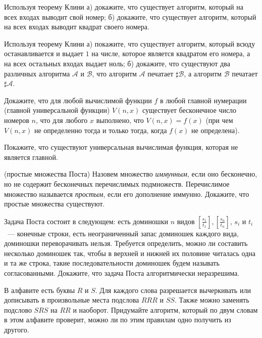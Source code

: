 \setcounter{curtask}{23}


\newcommand{\dom}[2]{\left[\frac{#1}{#2}\right]}


\begin{task}
    Используя теорему Клини а) докажите, что существует алгоритм, который на всех входах выводит свой номер;
    б) докажите, что существует алгоритм, который на всех входах выводит квадрат своего номера.
\end{task}

\begin{task}
    Используя теорему Клини а) покажите, что существует алгоритм, который всюду останавливается и выдает $1$ на числе, которое
    является квадратом его номера, а на всех остальных входах выдает ноль; б) докажите, что существуют два различных алгоритма
    $\mathcal{A}$ и $\mathcal{B}$, что алгоритм $\mathcal{A}$ печатает $\sharp \mathcal{B}$, а алгоритм $\mathcal{B}$ печатает
    $\sharp \mathcal{A}$. 
\end{task}

\begin{task}
	Докажите, что для любой вычислимой функции $f$ в любой главной нумерации (главной универсальной функции) $V(n, x)$ существует бесконечное число номеров $n$,
	что для любого $x$ выполнено, что $V(n, x) = f(x)$ (при чем $V(n, x)$ не определенно тогда и только тогда, когда $f(x)$ не определена).
\end{task}

\begin{task}
   Покажите, что существуют универсальная вычислимая функция, которая не является главной.
\end{task}


\breakline

\begin{ptask}{18} (простые множества Поста)
    Назовем множество {\it иммунным}, если оно бесконечно, но не содержит бесконечных перечислимых подмножеств. Перечислимое
    множество называется {\it простым}, если его дополнение иммунно. Докажите, что простые множества существуют.
\end{ptask}

\begin{ptask}{21}
	Задача Поста состоит в следующем: есть доминошки $n$ видов $\dom{s_1}{t_1}, \dom{s_n}{t_n}$, $s_i$ и $t_i$~--- конечные
    строки, есть неограниченный запас доминошек каждого вида, доминошки переворачивать нельзя. Требуется определить, можно ли
    составить несколько доминошек так, чтобы в верхней и нижней их половине читалась одна и та же строка, такие последовательности
    доминошек будем называть согласованными. Докажите, что задача Поста алгоритмически неразрешима.
\end{ptask}

\begin{ptask}{22}
	В алфавите есть буквы $R$ и $S$. Для каждого слова разрешается вычеркивать или дописывать в произвольные места подслова $RRR$
    и $SS$. Также можно заменять подслово $SRS$ на $RR$ и наоборот. Придумайте алгоритм, который по двум словам в этом алфавите
    проверит, можно ли по этим правилам одно получить из другого.
\end{ptask}
